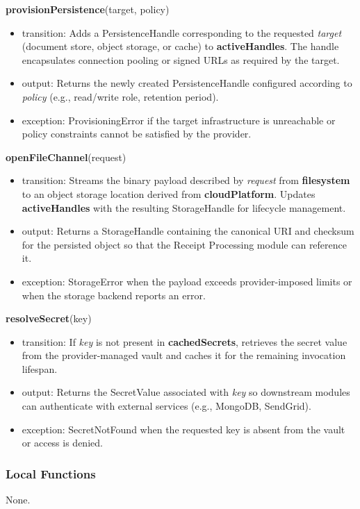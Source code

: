 \documentclass[12pt, titlepage]{article}
\begin{document}
\noindent\textbf{provisionPersistence}(target, policy)
\begin{itemize}
  \item transition: Adds a PersistenceHandle corresponding to the requested \textit{target} (document store, object storage, or cache) to \textbf{activeHandles}. The handle encapsulates connection pooling or signed URLs as required by the target.
  \item output: Returns the newly created PersistenceHandle configured according to \textit{policy} (e.g., read/write role, retention period).
  \item exception: ProvisioningError if the target infrastructure is unreachable or policy constraints cannot be satisfied by the provider.
\end{itemize}

\noindent\textbf{openFileChannel}(request)
\begin{itemize}
  \item transition: Streams the binary payload described by \textit{request} from \textbf{filesystem} to an object storage location derived from \textbf{cloudPlatform}. Updates \textbf{activeHandles} with the resulting StorageHandle for lifecycle management.
  \item output: Returns a StorageHandle containing the canonical URI and checksum for the persisted object so that the Receipt Processing module can reference it.
  \item exception: StorageError when the payload exceeds provider-imposed limits or when the storage backend reports an error.
\end{itemize}

\noindent\textbf{resolveSecret}(key)
\begin{itemize}
  \item transition: If \textit{key} is not present in \textbf{cachedSecrets}, retrieves the secret value from the provider-managed vault and caches it for the remaining invocation lifespan.
  \item output: Returns the SecretValue associated with \textit{key} so downstream modules can authenticate with external services (e.g., MongoDB, SendGrid).
  \item exception: SecretNotFound when the requested key is absent from the vault or access is denied.
\end{itemize}

\subsubsection{Local Functions}
None.
\end{document}
